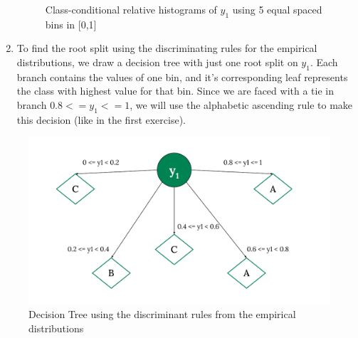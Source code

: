 \documentclass[12pt]{article}
\begin{document}
\begin{enumerate}
\begin{figure}[ht]
    \vspace{0.5cm} 

    \begin{minipage}[t]{0.48\linewidth}
        \centering
    \end{minipage}
    
    \caption{Class-conditional relative histograms of $y_1$ using 5 equal spaced bins in [0,1]}
\end{figure}

\vspace{15cm}

\item To find the root split using the discriminating rules for the empirical distributions, we draw a decision tree with just one root split on $y_1$.
Each branch contains the values of one bin, and it's corresponding leaf represents the class with highest value for that bin.
Since we are faced with a tie in branch $0.8 <= y_1 <= 1$, we will use the alphabetic ascending rule to make this decision (like in the first exercise).
\end{enumerate}

\begin{figure}[H]
    \centering
    \includegraphics[width=15cm]{./Part I/5 ary root split.pdf}
    \caption{Decision Tree using the discriminant rules from the empirical distributions}
\end{figure}
\end{document}
